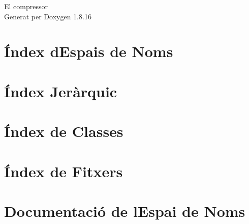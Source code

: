 \let\mypdfximage\pdfximage\def\pdfximage{\immediate\mypdfximage}\documentclass[twoside]{book}
\newcommand{\+}{\discretionary{\mbox{\scriptsize$\hookleftarrow$}}{}{}}
\newcommand{\clearemptydoublepage}{%
  \newpage{\pagestyle{empty}\cleardoublepage}%
}
\begin{document}
\hypersetup{pageanchor=false,
             bookmarksnumbered=true,
             pdfencoding=unicode
            }
\begin{titlepage}
\vspace*{7cm}
\begin{center}%
{\Large El compressor }\\
\vspace*{1cm}
{\large Generat per Doxygen 1.8.16}\\
\end{center}
\end{titlepage}
\clearemptydoublepage
{}
\tableofcontents
\clearemptydoublepage
{}
\hypersetup{pageanchor=true}

\chapter{Índex d\textquotesingle{}Espais de Noms}

\chapter{Índex Jeràrquic}

\chapter{Índex de Classes}

\chapter{Índex de Fitxers}

\chapter{Documentació de l\textquotesingle{}Espai de Noms}






\end{document}
